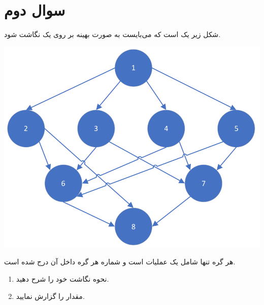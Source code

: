 \section{سوال دوم}


شکل زیر یک  است که می‌بایست به صورت بهینه بر روی یک  نگاشت شود.


\begin{center}
	\includegraphics*[width=0.5\linewidth]{pics/img1.png}
	\label{DFG سوال ۲}
\end{center}


هر گره تنها شامل یک عملیات است و شماره هر گره داخل آن درج شده است.

\begin{enumerate}
	\item نحوه نگاشت خود را شرح دهید.
	\begin{qsolve}
		
	\end{qsolve}
	
	
	
	\item 
	مقدار  را گزارش نمایید.
	
	\begin{qsolve}
		
	\end{qsolve}
\end{enumerate}